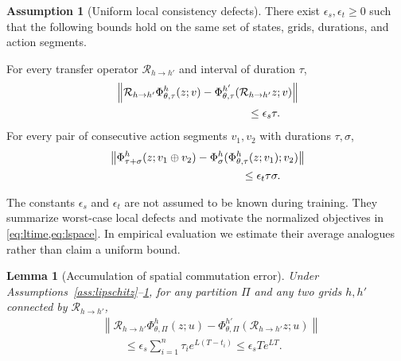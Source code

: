 \documentclass{article}
\theoremstyle{plain}
\newtheorem{lemma}[theorem]{Lemma}
\theoremstyle{definition}
\newtheorem{assumption}[theorem]{Assumption}
\theoremstyle{remark}
\newcommand{\PhiOp}{\Phi}
\newcommand{\Restr}{\mathcal{R}}
\newcommand{\norm}[1]{\left\lVert #1 \right\rVert}
\begin{document}
\begin{assumption}[Uniform local consistency defects]
\label{ass:local_defects}
There exist $\epsilon_s,\epsilon_t\ge0$ such that the following bounds hold on the same set of states, grids, durations, and action segments.

For every transfer operator $\Restr_{h\rightarrow h'}$ and interval of duration $\tau$,
\begin{equation}
\begin{split}
&\norm{
\Restr_{h\rightarrow h'}
\PhiOp^{h}_{\theta,\tau}(z;v)
-
\PhiOp^{h'}_{\theta,\tau}
(\Restr_{h\rightarrow h'}z;v)
}
\\
&\hspace{42mm}\le \epsilon_s\tau.
\end{split}
\label{eq:local_spatial_defect}
\end{equation}
For every pair of consecutive action segments $v_1,v_2$ with durations $\tau,\sigma$,
\begin{equation}
\begin{split}
&\norm{
\PhiOp^{h}_{\tau+\sigma}(z;v_1\oplus v_2)
-
\PhiOp^{h}_{\sigma}
(\PhiOp^{h}_{\theta,\tau}(z;v_1);v_2)
}
\\
&\hspace{42mm}\le \epsilon_t\tau\sigma.
\end{split}
\label{eq:local_temporal_defect}
\end{equation}
\end{assumption}
The constants $\epsilon_s$ and $\epsilon_t$ are not assumed to be known during training. They summarize worst-case local defects and motivate the normalized objectives in \cref{eq:ltime,eq:lspace}. In empirical evaluation we estimate their average analogues rather than claim a uniform bound.

\begin{lemma}[Accumulation of spatial commutation error]
\label{lem:spatial_accumulation}
Under Assumptions~\ref{ass:lipschitz}--\ref{ass:local_defects}, for any partition $\Pi$ and any two grids $h,h'$ connected by $\Restr_{h\rightarrow h'}$,
\begin{align}
&\norm{
\Restr_{h\rightarrow h'}
\PhiOp^{h}_{\theta,\Pi}(z;u)
-
\PhiOp^{h'}_{\theta,\Pi}
(\Restr_{h\rightarrow h'}z;u)
}
\nonumber\\
&\qquad\le
\epsilon_s
\sum_{i=1}^{n}
\tau_i e^{L(T-t_i)}
\le
\epsilon_s T e^{LT}.
\label{eq:spatial_accumulation}
\end{align}
\end{lemma}
\end{document}
